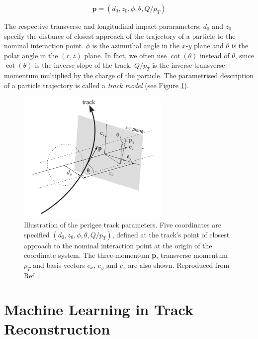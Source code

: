 \begin{equation}\label{perigee}
\textbf{p} = (d_0, z_0, \phi, \theta, Q/p_T)
\end{equation}

The respective transverse and longitudinal impact pararameters; $d_0$ and $z_0$ specify the distance of closest approach of the trajectory of a particle to the nominal interaction point. $\phi$ is the azimuthal angle in the $x$-$y$ plane and $\theta$ is the polar angle in the $(r,z)$ plane. In fact, we often use $\cot(\theta)$ instead of $\theta$, since $\cot(\theta)$ is the inverse slope of the track. $Q/p_T$ is the inverse transverse momentum multiplied by the charge of the particle. The parametrised description of a particle trajectory is called a \textit{track model} (see Figure \ref{fig:track-parameters-perigee}).


\begin{figure}[!htbp]
  \centering
  \includegraphics[width=0.65\textwidth]{images/3-track-reconstruction/track_params.pdf}
  \caption{Illustration of the perigee track parameters. Five coordinates are specified $(d_0, z_0, \phi, \theta, Q/p_T)$, defined at the track’s point of closest approach to the nominal interaction point at the origin of the coordinate system. The three-momentum \textbf{p}, transverse momentum $p_T$ and basis vectors $e_x$, $e_y$ and $e_z$ are also shown. Reproduced from Ref. \cite{atlastrackingdocs}
  }
  \label{fig:track-parameters-perigee}
\end{figure}






\section{Machine Learning in Track Reconstruction}
\label{ml-background}

